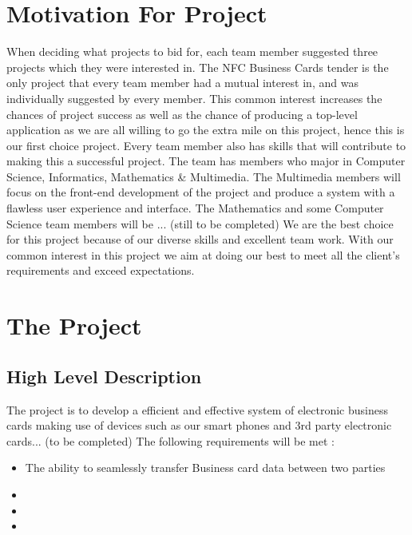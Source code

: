 \documentclass[11pt]{article}
\begin{document}
\section{Motivation For Project}
When deciding what projects to bid for, each team member suggested three projects which they were interested in. The NFC Business Cards tender is the only project that every team member had a mutual interest in, and was individually suggested by every member. This common interest increases the chances of project success as well as the chance of producing a top-level application as we are all willing to go the extra mile on this project, hence this is our first choice project.
\newline
\newline Every team member also has skills that will contribute to making this a successful project. The team has members who major in Computer Science, Informatics, Mathematics & Multimedia. The Multimedia members will focus on the front-end development of the project and produce a system with a flawless user experience and interface. The Mathematics and some Computer Science team members will be ... (still to be completed) 
\newline
\newline We are the best choice for this project because of our diverse skills and excellent team work. With our common interest in this project we aim at doing our best to meet all the client's requirements and exceed expectations.

\section{The Project}
\subsection{High Level Description}
The project is to develop a efficient and effective system of electronic business cards making use of devices such as our smart phones and 3rd party electronic cards... (to be completed)
\newline
\newline The following requirements will be met : 
\begin{itemize}
\item The ability to seamlessly transfer Business card data between two parties
\item
\item
\item
\end{itemize}
\end{document}
